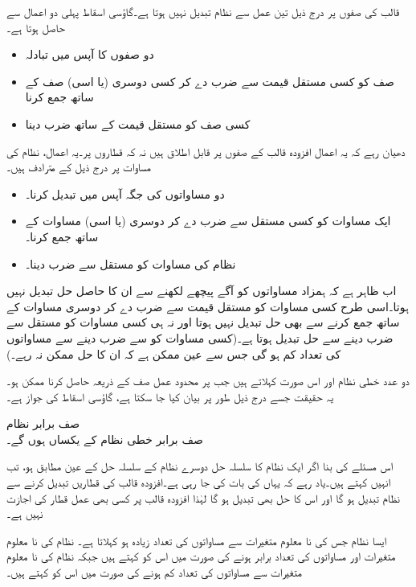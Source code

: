 قالب کی صفوں پر درج ذیل تین عمل سے نظام تبدیل نہیں ہوتا ہے۔گاؤسی اسقاط پہلی دو اعمال سے حاصل ہوتا ہے۔
\begin{itemize}
\item
دو صفوں کا آپس میں تبادلہ
\item
صف کو کسی مستقل قیمت سے ضرب دے کر کسی دوسری (یا اسی) صف کے ساتھ جمع کرنا
\item
کسی صف کو  مستقل قیمت  کے ساتھ ضرب دینا
\end{itemize} 
دھیان رہے کہ یہ اعمال افزودہ قالب کے صفوں پر قابل اطلاق ہیں نہ کہ قطاروں پر۔یہ اعمال، نظام کی مساوات پر درج ذیل کے مترادف ہیں۔
\begin{itemize}
\item
دو مساواتوں کی جگہ آپس میں تبدیل کرنا۔
\item
ایک مساوات کو کسی مستقل سے ضرب دے کر دوسری (یا اسی) مساوات کے ساتھ جمع کرنا۔
\item
نظام کی مساوات کو  مستقل  سے ضرب دینا۔
\end{itemize}

اب ظاہر ہے کہ ہمزاد مساواتوں کو آگے پیچھے لکھنے سے ان کا حاصل حل تبدیل نہیں ہوتا۔اسی طرح کسی مساوات کو مستقل قیمت سے ضرب دے کر دوسری مساوات کے ساتھ جمع کرنے سے بھی حل تبدیل نہیں ہوتا اور نہ ہی کسی مساوات کو  مستقل سے ضرب دینے سے حل تبدیل ہوتا ہے۔(کسی مساوات کو  سے ضرب دینے سے  مساواتوں کی تعداد کم ہو گی جس سے عین ممکن ہے کہ ان کا حل ممکن نہ رہے۔)

دو عدد خطی نظام  اور  اس صورت  کہلاتے ہیں جب  پر محدود عمل صف کے ذریعہ  حاصل کرنا ممکن ہو۔ یہ حقیقت جسے درج ذیل طور پر بیان کیا جا سکتا ہے، گاؤسی اسقاط کی جواز ہے۔

\quad صف برابر نظام\\
صف برابر خطی نظام کے  یکساں ہوں گے۔

اس مسئلے کی بنا اگر ایک نظام کا سلسلہ حل دوسرے نظام کے سلسلہ حل کے عین مطابق ہو، تب انہیں  کہتے ہیں۔یاد رہے کہ یہاں  کی بات کی جا رہی ہے۔افزودہ قالب کی قطاریں تبدیل کرنے سے نظام تبدیل ہو گا اور اس کا حل بھی تبدیل ہو گا لہٰذا افزودہ قالب پر کسی بھی عمل قطار کی اجازت نہیں ہے۔  

ایسا نظام جس کی نا معلوم متغیرات سے مساواتوں کی تعداد زیادہ ہو  کہلاتا ہے۔ نظام  کی نا معلوم متغیرات اور مساواتوں کی تعداد برابر ہونے کی صورت میں اس کو  کہتے ہیں جبکہ  نظام  کی نا معلوم متغیرات سے مساواتوں کی تعداد کم ہونے کی صورت میں اس کو   کہتے ہیں۔


